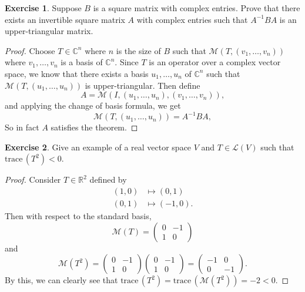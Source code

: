\documentclass{article}
\theoremstyle{definition}
\newtheorem{ex}{Exercise}
\begin{document}
\begin{ex}
	Suppose $B$ is a square matrix with complex entries.
	Prove that there exists an invertible square matrix $A$ with complex entries such that $A^{-1}BA$ is an upper-triangular matrix.
\end{ex}
\begin{proof}
	Choose $T \in \mathbb{C}^n$ where $n$ is the size of $B$ such that $\mathcal{M}(T, (v_1, \dots, v_n))$ where $v_1, \dots, v_n$ is a basis of $\mathbb{C}^n$.
	Since $T$ is an operator over a complex vector space, we know that there exists a basis $u_1, \dots, u_n$ of $\mathbb{C}^n$ such that $\mathcal{M}(T, (u_1, \dots, u_n))$ is upper-triangular.
	Then define \begin{equation*}
		A = \mathcal{M}(I, (u_1, \dots, u_n), (v_1, \dots, v_n)),
	\end{equation*} and applying the change of basis formula, we get \begin{equation*}
		\mathcal{M}(T, (u_1, \dots, u_n)) = A^{-1}BA,
	\end{equation*}
	So in fact $A$ satisfies the theorem.
\end{proof}

\begin{ex}
	Give an example of a real vector space $V$ and $T \in \mathcal{L}(V)$ such that $\mathrm{trace}\,(T^2) < 0$.
\end{ex}
\begin{proof}
	Consider $T \in \mathbb{R}^2$ defined by \begin{align*}
		(1, 0) & \mapsto (0, 1)   \\
		(0, 1) & \mapsto (-1, 0).
	\end{align*}
	Then with respect to the standard basis, \begin{equation*}
		\mathcal{M}(T) = \begin{pmatrix}
			0 & -1 \\
			1 & 0
		\end{pmatrix}
	\end{equation*}
	and \begin{equation*}
		\mathcal{M}(T^2) = \begin{pmatrix}
			0 & -1 \\
			1 & 0
		\end{pmatrix}\begin{pmatrix}
			0 & -1 \\
			1 & 0
		\end{pmatrix} = \begin{pmatrix}
			-1 & 0  \\
			0  & -1
		\end{pmatrix}.
	\end{equation*}
	By this, we can clearly see that $\mathrm{trace}\,(T^2) = \mathrm{trace}\,(\mathcal{M}(T^2)) = -2 < 0$.
\end{proof}
\end{document}
